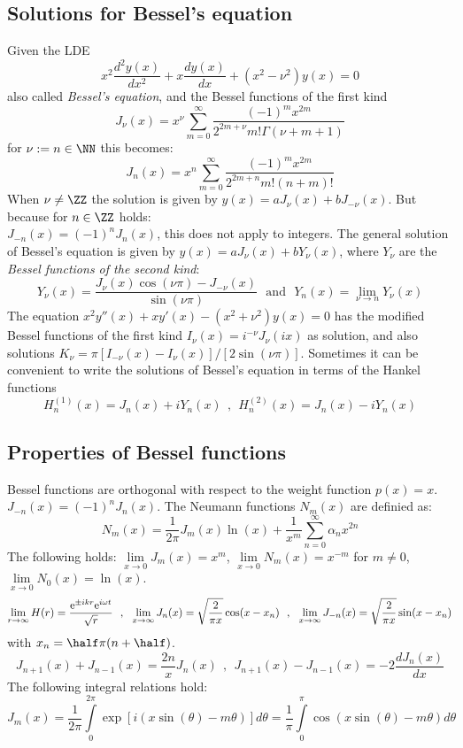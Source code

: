 \subsection{Solutions for Bessel's equation}
Given the LDE
\[
x^2\frac{d^2y(x)}{dx^2}+x\frac{dy(x)}{dx}+(x^2-\nu^2)y(x)=0
\]
also called {\it Bessel's equation}, and the Bessel functions of the first
kind
\[
J_\nu(x)=x^\nu\sum_{m=0}^\infty\frac{(-1)^mx^{2m}}{2^{2m+\nu}m!\Gamma(\nu+m+1)}
\]
for $\nu:=n\in\NN$ this becomes:
\[
J_n(x)=x^n\sum_{m=0}^\infty\frac{(-1)^mx^{2m}}{2^{2m+n}m!(n+m)!}
\]
When $\nu\neq\ZZ$ the solution is given by $y(x)=aJ_\nu(x)+bJ_{-\nu}(x)$.
But because for $n\in\ZZ$ holds:\\ $J_{-n}(x)=(-1)^nJ_n(x)$, this does not
apply to integers. The general solution of Bessel's equation is given by
$y(x)=aJ_\nu(x)+bY_\nu(x)$, where $Y_\nu$ are the {\it Bessel functions of the
second kind}:
\[
Y_\nu(x)=\frac{J_\nu(x)\cos(\nu\pi)-J_{-\nu}(x)}{\sin(\nu\pi)}~~~\mbox{and}~~~
Y_n(x)=\lim_{\nu\rightarrow n}Y_\nu(x)
\]
The equation $x^2y''(x)+xy'(x)-(x^2+\nu^2)y(x)=0$ has the modified
Bessel functions of the first kind $I_\nu(x)=i^{-\nu}J_\nu(ix)$ as solution,
and also solutions $K_\nu=\pi[I_{-\nu}(x)-I_\nu(x)]/[2\sin(\nu\pi)]$.
\npar
Sometimes it can be convenient to write the solutions of Bessel's equation in
terms of the Hankel functions
\[
H^{(1)}_n(x)=J_n(x)+iY_n(x)~~,~~H^{(2)}_n(x)=J_n(x)-iY_n(x)
\]

\subsection{Properties of Bessel functions}
Bessel functions are orthogonal with respect to the weight function $p(x)=x$.
\npar
$J_{-n}(x)=(-1)^nJ_n(x)$. The Neumann functions $N_m(x)$ are definied as:
\[
N_m(x)=\frac{1}{2\pi}J_m(x)\ln(x)+\frac{1}{x^m}\sum_{n=0}^\infty \alpha_nx^{2n}
\]
The following holds: $\lim\limits_{x\rightarrow0}J_m(x)=x^m$,
$\lim\limits_{x\rightarrow0}N_m(x)=x^{-m}$ for $m\neq0$,
$\lim\limits_{x\rightarrow0}N_0(x)=\ln(x)$.
\[
\lim_{r\rightarrow\infty}H(r)=\frac{{\rm e}^{\pm ikr}{\rm e}^{i\omega t}}{\sqrt{r}}~~,~~
\lim_{x\rightarrow\infty}J_n(x)=\sqrt{\frac{2}{\pi x}}\cos(x-x_n)~~,~~
\lim_{x\rightarrow\infty}J_{-n}(x)=\sqrt{\frac{2}{\pi x}}\sin(x-x_n)
\]
with $x_n=\half\pi(n+\half)$.
\[
J_{n+1}(x)+J_{n-1}(x)=\frac{2n}{x}J_n(x)~~,~~J_{n+1}(x)-J_{n-1}(x)=-2\frac{dJ_n(x)}{dx}
\]
The following integral relations hold:
\[
J_m(x)=\frac{1}{2\pi}\int\limits_0^{2\pi}\exp[i(x\sin(\theta)-m\theta)]d\theta=
\frac{1}{\pi}\int\limits_0^\pi\cos(x\sin(\theta)-m\theta)d\theta
\]

